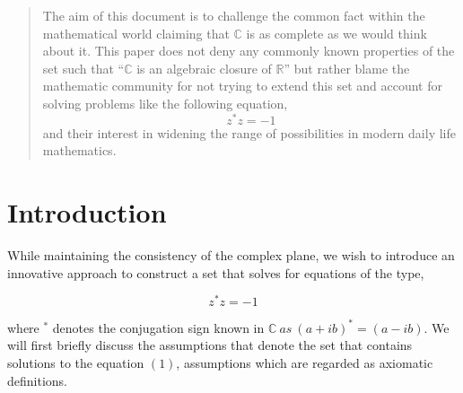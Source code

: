 \documentclass{article}
\newenvironment{AMS}{}{}
\newenvironment{keywords}{}{}
\begin{document}
\newpage
\maketitle
\begin{abstract}
    The aim of this document is to challenge the common fact within the
    mathematical world claiming that $\mathbb{C}$ is as complete as we
    would think about it. This paper does not deny any commonly known
    properties of the set such that ``$\mathbb{C}$ is an algebraic closure
    of $\mathbb{R}$'' but rather blame the mathematic community for not
    trying to extend this set and account for solving problems like the
    following equation,
    $$ z^{*}z = -1 $$
    and their interest in widening the range of possibilities in modern
    daily life mathematics.
\end{abstract}



\section{Introduction}
While maintaining the consistency of the complex plane, we wish to introduce
an innovative approach to construct a set that solves for equations of the type,

\begin{equation}
    z^{*}z = -1 
\end{equation}

where $^{*}$ denotes the conjugation sign known in $\mathbb{C}\ as\ (a+ib)^{*} = (a-ib)$.
We will first briefly discuss the assumptions that denote the set that contains
solutions to the equation $(1)$, assumptions which are regarded as axiomatic definitions.
\end{document}
